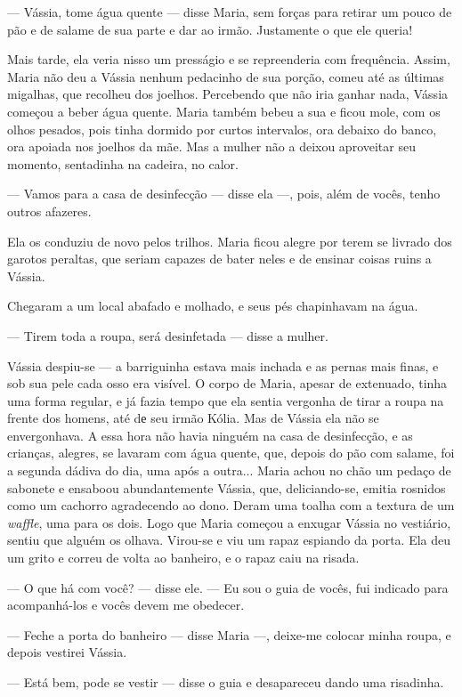 --- Vássia, tome água quente --- disse Maria, sem forças para retirar um
pouco de pão e de salame de sua parte e dar ao irmão. Justamente o que
ele queria!

Mais tarde, ela veria nisso um presságio e se repreenderia com
frequência. Assim, Maria não deu a Vássia nenhum pedacinho de sua
porção, comeu até as últimas migalhas, que recolheu dos joelhos.
Percebendo que não iria ganhar nada, Vássia começou a beber água quente.
Maria também bebeu a sua e ficou mole, com os olhos pesados, pois tinha
dormido por curtos intervalos, ora debaixo do banco, ora apoiada nos
joelhos da mãe. Mas a mulher não a deixou aproveitar seu momento,
sentadinha na cadeira, no calor.

--- Vamos para a casa de desinfecção --- disse ela ---, pois, além de
vocês, tenho outros afazeres.

Ela os conduziu de novo pelos trilhos. Maria ficou alegre por terem se
livrado dos garotos peraltas, que seriam capazes de bater neles e de
ensinar coisas ruins a Vássia.

Chegaram a um local abafado e molhado, e seus pés chapinhavam na água.

--- Tirem toda a roupa, será desinfetada --- disse a mulher.

Vássia despiu-se --- a barriguinha estava mais inchada e as pernas mais
finas, e sob sua pele cada osso era visível. O corpo de Maria, apesar de
extenuado, tinha uma forma regular, e já fazia tempo que ela sentia
vergonha de tirar a roupa na frente dos homens, até dе seu irmão Kólia.
Mas de Vássia ela não se envergonhava. A essa hora não havia ninguém na
casa de desinfecção, e as crianças, alegres, se lavaram com água quente,
que, depois do pão com salame, foi a segunda dádiva do dia, uma após a
outra... Maria achou no chão um pedaço de sabonete e ensaboou
abundantemente Vássia, que, deliciando-se, emitia rosnidos como um
cachorro agradecendo ao dono. Deram uma toalha com a textura de um
\emph{waffle}, uma para os dois. Logo que Maria começou a enxugar Vássia
no vestiário, sentiu que alguém os olhava. Virou-se e viu um rapaz
espiando da porta. Ela deu um grito e correu de volta ao banheiro, e o
rapaz caiu na risada.

--- O que há com você? --- disse ele. --- Eu sou o guia de vocês, fui
indicado para acompanhá-los e vocês devem me obedecer.

--- Feche a porta do banheiro --- disse Maria ---, deixe-me colocar
minha roupa, e depois vestirei Vássia.

--- Está bem, pode se vestir --- disse o guia e desapareceu dando uma
risadinha.

